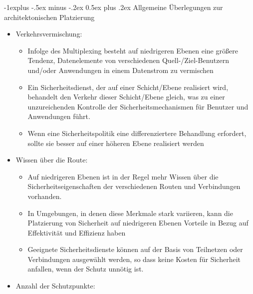 \documentclass[a4paper]{article}
\makeatletter
\renewcommand{\subsection}{\@startsection{subsection}{2}{0mm}%
 {-1explus -.5ex minus -.2ex}%
 {0.5ex plus .2ex}%
 {\normalfont\normalsize\bfseries}}
\makeatother
\begin{document}
\begin{multicols}{3}
    \subsection{Allgemeine Überlegungen zur architektonischen
        Platzierung}

    \begin{itemize}
        \item
              Verkehrsvermischung:

              \begin{itemize}
                  \item
                        Infolge des Multiplexing besteht auf niedrigeren Ebenen eine größere
                        Tendenz, Datenelemente von verschiedenen Quell-/Ziel-Benutzern
                        und/oder Anwendungen in einem Datenstrom zu vermischen
                  \item
                        Ein Sicherheitsdienst, der auf einer Schicht/Ebene realisiert wird,
                        behandelt den Verkehr dieser Schicht/Ebene gleich, was zu einer
                        unzureichenden Kontrolle der Sicherheitsmechanismen für Benutzer und
                        Anwendungen führt.
                  \item
                        Wenn eine Sicherheitspolitik eine differenziertere Behandlung
                        erfordert, sollte sie besser auf einer höheren Ebene realisiert
                        werden
              \end{itemize}
        \item
              Wissen über die Route:

              \begin{itemize}
                  \item
                        Auf niedrigeren Ebenen ist in der Regel mehr Wissen über die
                        Sicherheitseigenschaften der verschiedenen Routen und Verbindungen
                        vorhanden.
                  \item
                        In Umgebungen, in denen diese Merkmale stark variieren, kann die
                        Platzierung von Sicherheit auf niedrigeren Ebenen Vorteile in Bezug
                        auf Effektivität und Effizienz haben
                  \item
                        Geeignete Sicherheitsdienste können auf der Basis von Teilnetzen
                        oder Verbindungen ausgewählt werden, so dass keine Kosten für
                        Sicherheit anfallen, wenn der Schutz unnötig ist.
              \end{itemize}
        \item
              Anzahl der Schutzpunkte:


\end{itemize}
\end{multicols}
\end{document}

